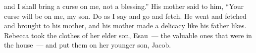 \begin{inparaenum}
  and I shall bring a curse on me, not a blessing.''%
   His mother said to him, ``Your curse will be on me, my son. Do as I say%
  and go and fetch.\understood%
   He went and fetched and brought to his mother, and his mother made a delicacy like his father likes.%
   Rebecca took the clothes of her elder son, Esau~--- the valuable ones that were in the house~--- and put them on her younger son, Jacob.%
  
  
  
  
  
\end{inparaenum}
